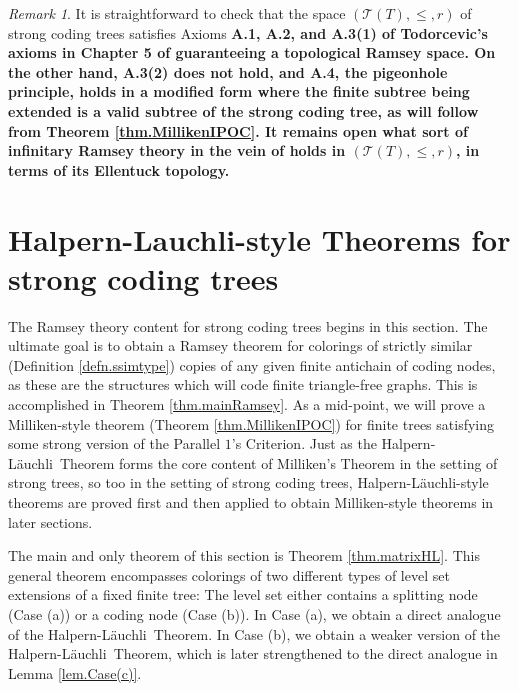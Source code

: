 \documentclass{amsart}
\theoremstyle{remark}
\newtheorem{rem}[thm]{Remark}
\theoremstyle{definition}
\theoremstyle{remark}
\newcommand{\POC}{Parallel $1$'s Criterion}
\newcommand{\Lauchli}{L{\"{a}}uchli}
\begin{document}
\begin{rem}
It is straightforward to check
that the
space $(\mathcal{T}(T),\le, r)$ of strong coding trees
satisfies Axioms \bf A.1\rm, \bf A.2\rm, and \bf A.3(1) \rm of Todorcevic's   axioms  in Chapter 5 of \cite{TodorcevicBK10} guaranteeing a  topological Ramsey space.
On the other hand,
\bf A.3(2) \rm does not hold, and \bf A.4\rm, the pigeonhole principle, holds in a  modified form where the finite  subtree being extended is a valid subtree of the strong coding tree,
as will follow from Theorem \ref{thm.MillikenIPOC}.
It remains open what sort of infinitary Ramsey theory in the vein of \cite{Milliken81}
 holds in $(\mathcal{T}(T),\le, r)$,  in terms of  its Ellentuck topology.
\end{rem}




\section{Halpern-Lauchli-style Theorems for strong coding trees}\label{sec.5}






The
Ramsey theory content for strong coding trees
begins in this section.
The  ultimate goal is to obtain a Ramsey theorem for colorings of strictly similar (Definition \ref{defn.ssimtype}) copies of any given finite antichain of coding nodes, as these are the structures which will code finite triangle-free graphs.
This is accomplished in Theorem \ref{thm.mainRamsey}.
As a mid-point, we will prove a Milliken-style theorem (Theorem  \ref{thm.MillikenIPOC}) for
finite trees satisfying some strong version of the \POC.
Just as
 the Halpern-\Lauchli\ Theorem forms
the core content
 of Milliken's Theorem in the setting of strong trees,
so too in the setting of strong coding trees,
 Halpern-\Lauchli-style theorems are proved first and then applied to obtain
 Milliken-style theorems in later sections.




The main and only theorem of this section is
Theorem  \ref{thm.matrixHL}.
This  general theorem  encompasses colorings of two different types  of level set  extensions of a fixed finite tree: The  level set  either contains a splitting node (Case (a)) or a coding node (Case (b)).
In Case (a), we obtain a direct analogue of the
Halpern-\Lauchli\ Theorem.
In Case (b), we obtain a weaker version of the
Halpern-\Lauchli\ Theorem, which is later strengthened to
the direct analogue in Lemma \ref{lem.Case(c)}.
\end{document}
